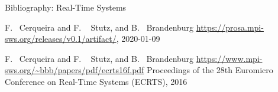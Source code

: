 \documentclass{beamer}
\begin{document}
	

		
	\begin{frame}{Bibliography: Real-Time Systems}
		\begin{thebibliography}{10}
		\beamertemplatebookbibitems
		
		F.~ Cerqueira and  F. ~ Stutz, and B.~ Brandenburg
		\newblock {}
		\newblock \url{https://prosa.mpi-sws.org/releases/v0.1/artifact/},  2020-01-09
		
		\beamertemplatearticlebibitems
		
		F.~ Cerqueira and  F. ~ Stutz, and B.~ Brandenburg		
		\newblock {}	
		\newblock \url{https://www.mpi-sws.org/~bbb/papers/pdf/ecrts16f.pdf}
		\newblock Proceedings of the 28th Euromicro Conference on Real-Time Systems (ECRTS), 2016	
		\end{thebibliography}	
	\end{frame}		
	
\end{document}
